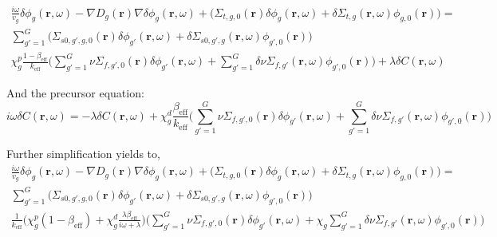 \begin{equation}
        \begin{aligned}
                \frac{i \omega}{v_g} \delta \phi_g (\textbf{r}, \omega) - \nabla D_g(\textbf{r}) \nabla \delta \phi_g(\textbf{r}, \omega) + \biggl(\Sigma_{t,g,0}(\textbf{r}) \delta \phi_g(\textbf{r}, \omega) + \delta \Sigma_{t,g}(\textbf{r}, \omega) \phi_{g,0}(\textbf{r}) \biggr) = \\
                \sum_{g' = 1}^{G} \biggl(\Sigma_{s0,g',g,0}(\textbf{r}) \delta \phi_{g'}(\textbf{r}, \omega) + \delta \Sigma_{s0,g',g}(\textbf{r}, \omega) \phi_{g',0}(\textbf{r}) \biggr)\\
                \chi^p_g \frac{1-\beta_{\text{eff}}}{k_{\text{eff}}} \biggl(\sum_{g' = 1}^{G} \nu \Sigma_{f,g',0}(\textbf{r}) \delta \phi_{g'}(\textbf{r}, \omega) + \sum_{g' = 1}^{G} \delta \nu \Sigma_{f,g'}(\textbf{r}, \omega) \phi_{g',0}(\textbf{r}) \biggr) + \lambda \delta C(\textbf{r}, \omega)
        \end{aligned}
        \label{eq:freq_1}
\end{equation}

And the precursor equation:
\begin{equation}
        i \omega \delta C(\textbf{r}, \omega) = - \lambda \delta C(\textbf{r}, \omega) + \chi^d_g \frac{\beta_{\text{eff}}}{k_{\text{eff}}}\biggl(\sum_{g' = 1}^{G} \nu \Sigma_{f,g',0}(\textbf{r}) \delta \phi_{g'}(\textbf{r}, \omega) + \sum_{g' = 1}^{G} \delta \nu \Sigma_{f,g'}(\textbf{r}, \omega) \phi_{g',0}(\textbf{r}) \biggr)
        \label{eq:freq_2}
\end{equation}

Further simplification yields to,
\begin{equation}
        \begin{aligned}
                \frac{i \omega}{v_g} \delta \phi_g (\textbf{r}, \omega) - \nabla D_g(\textbf{r}) \nabla \delta \phi_g(\textbf{r}, \omega) + \biggl(\Sigma_{t,g,0}(\textbf{r}) \delta \phi_g(\textbf{r}, \omega) + \delta \Sigma_{t,g}(\textbf{r}, \omega) \phi_{g,0}(\textbf{r}) \biggr) = \\
                \sum_{g' = 1}^{G} \biggl(\Sigma_{s0,g',g,0}(\textbf{r}) \delta \phi_{g'}(\textbf{r}, \omega) + \delta \Sigma_{s0,g',g}(\textbf{r}, \omega) \phi_{g',0}(\textbf{r}) \biggr)\\
                \frac{1}{k_{\text{eff}}} \biggl( \chi^p_g (1-\beta_{\text{eff}}) + \chi^d_g \frac{\lambda \beta_{\text{eff}}}{i \omega + \lambda} \biggr)  \biggl(\sum_{g' = 1}^{G} \nu \Sigma_{f,g',0}(\textbf{r}) \delta \phi_{g'}(\textbf{r}, \omega) + \chi_g \sum_{g' = 1}^{G} \delta \nu \Sigma_{f,g'}(\textbf{r}, \omega) \phi_{g',0}(\textbf{r}) \biggr)
        \end{aligned}
        \label{eq:freq_4}
\end{equation}

